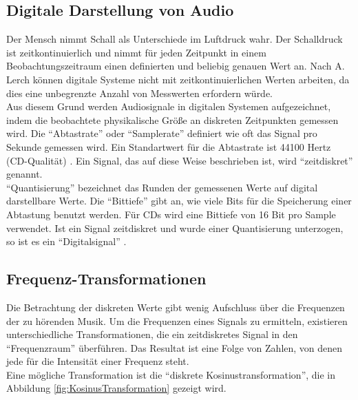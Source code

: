 \documentclass[11pt,a4paper]{article}
\begin{document}
\newpage
\subsection{Digitale Darstellung von Audio}
\label{sec:DigitaleDarstellungAudio}
Der Mensch nimmt Schall als Unterschiede im Luftdruck wahr. Der Schalldruck ist zeitkontinuierlich und nimmt für jeden Zeitpunkt in einem Beobachtungszeitraum einen definierten und beliebig genauen Wert an. Nach A. Lerch \cite[S. 9]{lerch2012introduction} können digitale Systeme nicht mit zeitkontinuierlichen Werten arbeiten, da dies eine unbegrenzte Anzahl von Messwerten erfordern würde.\\
Aus diesem Grund werden Audiosignale in digitalen Systemen aufgezeichnet, indem die beobachtete physikalische Größe an diskreten Zeitpunkten gemessen wird. Die ``Abtastrate'' oder ``Samplerate'' definiert wie oft das Signal pro Sekunde gemessen wird. Ein Standartwert für die Abtastrate ist 44100 Hertz (CD-Qualität) \cite[S. 4]{lerch2012introduction}.  Ein Signal, das auf diese Weise beschrieben ist, wird ``zeitdiskret'' genannt.\\
``Quantisierung'' bezeichnet das Runden der gemessenen Werte auf digital darstellbare Werte. Die ``Bittiefe'' gibt an, wie viele Bits für die Speicherung einer Abtastung benutzt werden. Für CDs wird eine Bittiefe von 16 Bit pro Sample verwendet. Ist ein Signal zeitdiskret und wurde einer Quantisierung unterzogen, so ist es ein ``Digitalsignal'' \cite[S. 10]{kammeyer2013digitale}.

\subsection{Frequenz-Transformationen}
Die Betrachtung der diskreten Werte gibt wenig Aufschluss über die Frequenzen der zu hörenden Musik. Um die Frequenzen eines Signals zu ermitteln, existieren unterschiedliche Transformationen, die ein zeitdiskretes Signal in den ``Frequenzraum'' überführen. Das Resultat ist eine Folge von Zahlen, von denen jede für die Intensität einer Frequenz steht.\\
Eine mögliche Transformation ist die ``diskrete Kosinustransformation'', die in Abbildung \ref{fig:KosinusTransformation} gezeigt wird.
\end{document}
